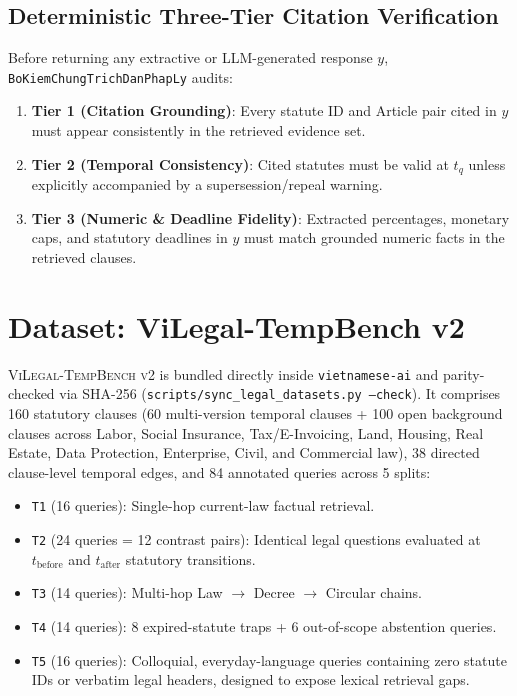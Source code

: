 \documentclass[11pt,a4paper]{article}
\begin{document}
\subsection{Deterministic Three-Tier Citation Verification}
Before returning any extractive or LLM-generated response $y$, \texttt{BoKiemChungTrichDanPhapLy} audits:
\begin{enumerate}
  \item \textbf{Tier 1 (Citation Grounding)}: Every statute ID and Article pair cited in $y$ must appear consistently in the retrieved evidence set.
  \item \textbf{Tier 2 (Temporal Consistency)}: Cited statutes must be valid at $t_q$ unless explicitly accompanied by a supersession/repeal warning.
  \item \textbf{Tier 3 (Numeric \& Deadline Fidelity)}: Extracted percentages, monetary caps, and statutory deadlines in $y$ must match grounded numeric facts in the retrieved clauses.
\end{enumerate}

\section{Dataset: ViLegal-TempBench v2}
\textsc{ViLegal-TempBench v2} is bundled directly inside \texttt{vietnamese-ai} and parity-checked via SHA-256 (\texttt{scripts/sync\_legal\_datasets.py --check}). It comprises 160 statutory clauses (60 multi-version temporal clauses + 100 open background clauses across Labor, Social Insurance, Tax/E-Invoicing, Land, Housing, Real Estate, Data Protection, Enterprise, Civil, and Commercial law), 38 directed clause-level temporal edges, and 84 annotated queries across 5 splits:
\begin{itemize}
  \item \texttt{T1} (16 queries): Single-hop current-law factual retrieval.
  \item \texttt{T2} (24 queries = 12 contrast pairs): Identical legal questions evaluated at $t_{\text{before}}$ and $t_{\text{after}}$ statutory transitions.
  \item \texttt{T3} (14 queries): Multi-hop Law $\to$ Decree $\to$ Circular chains.
  \item \texttt{T4} (14 queries): 8 expired-statute traps + 6 out-of-scope abstention queries.
  \item \texttt{T5} (16 queries): Colloquial, everyday-language queries containing zero statute IDs or verbatim legal headers, designed to expose lexical retrieval gaps.
\end{itemize}
\end{document}
